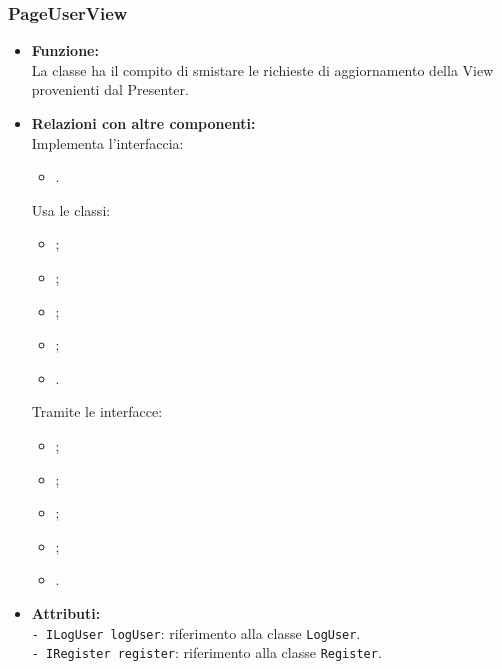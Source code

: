 {\begin{sloppypar}
{		%
		\subsubsection{PageUserView}\label{ssub:PageUserView}{
		\begin{itemize}
			\item[] \textbf{Funzione:} \\
			La classe ha il compito di smistare le richieste di aggiornamento della View provenienti dal Presenter.
			
			\item[] \textbf{Relazioni con altre componenti:} \\
			Implementa l'interfaccia:
			\begin{itemize}
				\item[] .
			\end{itemize}
			Usa le classi:
			\begin{itemize}
				\item[] ;
				\item[] ;
				\item[] ;
				\item[] ;
				\item[] .
			\end{itemize}
			Tramite le interfacce:
			\begin{itemize}
				\item[] ;
				\item[] ;
				\item[] ;
				\item[] ;
				\item[] .
			\end{itemize}
			
			\item[] \textbf{Attributi:}\\
				\texttt{- ILogUser logUser}: riferimento alla classe \texttt{LogUser}.\\
				
				\texttt{- IRegister register}: riferimento alla classe \texttt{Register}.\\
				

\end{itemize}}}
\end{sloppypar}}
